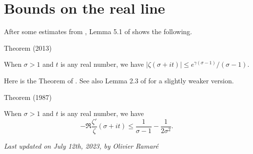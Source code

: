 \par 
\section{Bounds on the real line}


After some estimates
from \cite{Bastion-Rogalaski*02}, 
Lemma 5.1 of \cite{Ramare*13d} shows
the following.
\par 
\begin{thm}{Theorem (2013)}

  When $\sigma> 1$ and $t$ is any real number, we have $|\zeta(\sigma+it)|\le   e^{\gamma(\sigma-1) }/(\sigma-1)$.
\end{thm}


Here is the Theorem of
\cite{Delange*87}.
See also Lemma 2.3 of
\cite{Ford*01} for a
slightly weaker version.
\par 
\begin{thm}{Theorem (1987)}

  When $\sigma> 1$ and $t$ is any real number, we have
  $$
  -\Re\frac{\zeta'}{\zeta}(\sigma+it)\le
  \frac{1}{\sigma-1}-\frac{1}{2\sigma^2}.
  $$ 
\end{thm}








  
\begin{flushright}\small\sl{}   Last updated on July 12th, 2023, by Olivier Ramar\'e
 \end{flushright}















